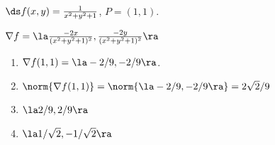 {$\ds f(x,y) = \frac{1}{x^2+y^2+1}$, $P = (1,1)$.
}
{$\nabla f = \la \frac{-2x}{(x^2+y^2+1)^2}, \frac{-2y}{(x^2+y^2+1)^2}\ra$
\begin{enumerate}
	\item  $\nabla f(1,1) = \la -2/9,-2/9\ra$.
	\item		$\norm{\nabla f(1,1)} = \norm{\la -2/9,-2/9\ra}=2\sqrt{2}/9$
	\item		$\la 2/9,2/9\ra$
	\item		$\la 1/\sqrt{2},-1/\sqrt{2}\ra$
\end{enumerate}
}